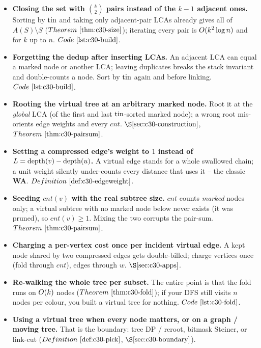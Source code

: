 
\begin{itemize}[nosep, leftmargin=1.4em]
  \item \textbf{Closing the set with \(\binom{k}{2}\) pairs instead of the \(k-1\) adjacent ones.}
        Sorting by \(\operatorname{tin}\) and taking only adjacent-pair LCAs already gives all of
        \(A(S)\setminus S\) (\(\thmref{c30-size}\)); iterating every pair is \(O(k^2\log n)\)
        and \tle for \(k\) up to \(n\). \(\coderef{c30-build}\).
  \item \textbf{Forgetting the dedup after inserting LCAs.} An adjacent LCA can equal a marked node
        or another LCA; leaving duplicates breaks the stack invariant and double-counts a node.
        Sort by \(\operatorname{tin}\) again and  before linking. \(\coderef{c30-build}\).
  \item \textbf{Rooting the virtual tree at an arbitrary marked node.} Root it at the \emph{global}
        LCA (of the first and last \(\operatorname{tin}\)-sorted marked node); a wrong root mis-orients edge
        weights and every \(\mathit{cnt}\). \(\secref{c30-construction}\), \(\thmref{c30-pairsum}\).
  \item \textbf{Setting a compressed edge's weight to \(1\) instead of \(L=\operatorname{depth}(v)-\operatorname{depth}(u)\).}
        A virtual edge stands for a whole swallowed chain; a unit weight silently under-counts
        every distance that uses it -- the classic \textbf{WA}. \(\defref{c30-edgeweight}\).
  \item \textbf{Seeding \(\mathit{cnt}(v)\) with the real subtree size.} \(\mathit{cnt}\) counts
        \emph{marked} nodes only; a virtual subtree with no marked node below never exists (it was
        pruned), so \(\mathit{cnt}(v)\ge1\). Mixing the two corrupts the pair-sum. \(\thmref{c30-pairsum}\).
  \item \textbf{Charging a per-vertex cost once per incident virtual edge.} A kept node shared by two
        compressed edges gets double-billed; charge vertices once (fold through \(\mathit{cnt}\)),
        edges through \(\mathit{w}\). \(\secref{c30-apps}\).
  \item \textbf{Re-walking the whole tree per subset.} The entire point is that the fold runs on
        \(O(k)\) nodes (\(\thmref{c30-fold}\)); if your DFS still visits \(n\) nodes per colour,
        you built a virtual tree for nothing. \(\coderef{c30-fold}\).
  \item \textbf{Using a virtual tree when every node matters, or on a graph / moving tree.} That is
        the boundary: tree DP / reroot, bitmask Steiner, or link-cut (\(\defref{c30-pick}\),
        \(\secref{c30-boundary}\)).
\end{itemize}

